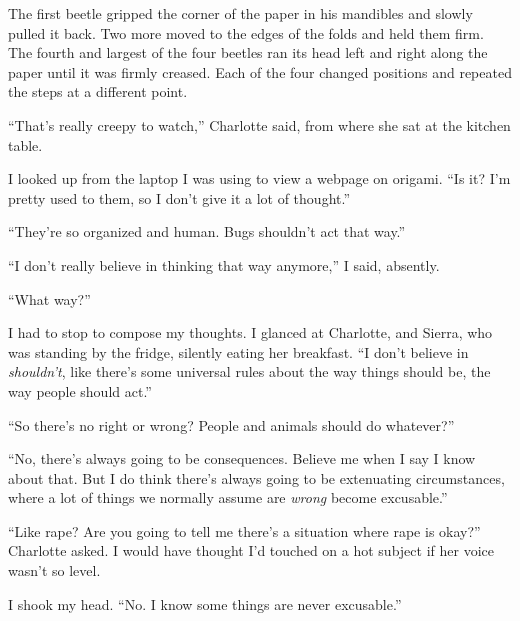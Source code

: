 





The first beetle gripped the corner of the paper in his mandibles and slowly pulled it back.  Two more moved to the edges of the folds and held them firm.  The fourth and largest of the four beetles ran its head left and right along the paper until it was firmly creased.  Each of the four changed positions and repeated the steps at a different point.



``That's really creepy to watch,'' Charlotte said, from where she sat at the kitchen table.



I looked up from the laptop I was using to view a webpage on origami.  ``Is it?  I'm pretty used to them, so I don't give it a lot of thought.''



``They're so organized and human.  Bugs shouldn't act that way.''



``I don't really believe in thinking that way anymore,'' I said, absently.



``What way?''



I had to stop to compose my thoughts.  I glanced at Charlotte, and Sierra, who was standing by the fridge, silently eating her breakfast.  ``I don't believe in \emph{shouldn't}, like there's some universal rules about the way things should be, the way people should act.''



``So there's no right or wrong?  People and animals should do whatever?''



``No, there's always going to be consequences.  Believe me when I say I know about that.  But I do think there's always going to be extenuating circumstances, where a lot of things we normally assume are \emph{wrong }become excusable.''



``Like rape?  Are you going to tell me there's a situation where rape is okay?''  Charlotte asked.  I would have thought I'd touched on a hot subject if her voice wasn't so level.



I shook my head.  ``No.  I know some things are never excusable.''



